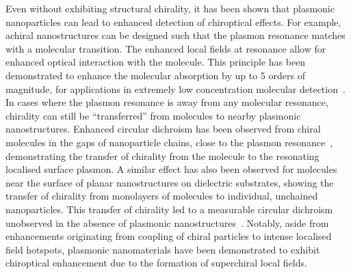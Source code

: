 Even without exhibiting structural chirality, it has been shown that plasmonic nanoparticles can lead to enhanced detection of chiroptical effects. For example, achiral nanostructures can be designed such that the plasmon resonance matches with a molecular transition. The enhanced local fields at resonance allow for enhanced optical interaction with the molecule. This principle has been demonstrated to enhance the molecular absorption by up to 5 orders of magnitude, for applications in extremely low concentration molecular detection~\cite{Cheng2015}. In cases where the plasmon resonance is away from any molecular resonance, chirality can still be ``transferred'' from molecules to nearby plasmonic nanostructures. Enhanced circular dichroism has been observed from chiral molecules in the gaps of nanoparticle chains, close to the plasmon resonance~\cite{Zhang2013, Wang2014c, DiGregorio2015}, demonstrating the transfer of chirality from the molecule to the resonating localised surface plasmon. A similar effect has also been observed for molecules near the surface of planar nanostructures on dielectric substrates, showing the transfer of chirality from monolayers of molecules to individual, unchained nanoparticles. This transfer of chirality led to a measurable circular dichroism unobserved in the absence of plasmonic nanostructures~\cite{Maoz2013}. Notably, aside from enhancements originating from coupling of chiral particles to intense localised field hotspots, plasmonic nanomaterials have been demonstrated to exhibit chiroptical enhancement due to the formation of superchiral local fields.

